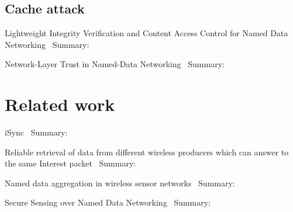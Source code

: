 \subsection{Cache attack}

Lightweight Integrity Verification and Content Access Control for Named Data Networking~\cite{DBLP:journals/tifs/LiZZSF15}
Summary:


Network-Layer Trust in Named-Data Networking~\cite{DBLP:journals/ccr/GhaliTU14}
Summary:


\section{Related work}
iSync~\cite{DBLP:conf/acmicn/FuAC14}
Summary:


Reliable retrieval of data from different wireless producers which can answer to the same Interest packet~\cite{DBLP:conf/acmicn/AmadeoCM14}
Summary:


Named data aggregation in wireless sensor networks~\cite{DBLP:conf/noms/AbidySLF14}
Summary:


Secure Sensing over Named Data Networking~\cite{DBLP:conf/nca/BurkeGNT14}
Summary:

